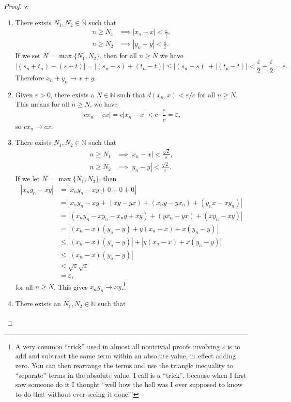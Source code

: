 \documentclass{article}
\newcommand{\N}{\mathbb{N}}
\theoremstyle{definition}
\begin{document}
	\begin{proof}{\color{white}w}
		\begin{enumerate}
			\item There exists $ N_1,N_2\in\N $ such that  
			\begin{align*}
				n\ge N_1&\implies |x_n-x|<\frac{\varepsilon}{2},\\
				n\ge N_2&\implies |y_n-y|<\frac{\varepsilon}{2}.
			\end{align*} 
			If we set $ N=\max\{N_1,N_2\} $, then for all $ n\ge N $ we have $$ |(s_n+t_n)-(s+t)|=|(s_n-s)+(t_n-t)|\le|(s_n-s)|+|(t_n-t)|<\frac{\varepsilon}{2}+\frac{\varepsilon}{2}=\varepsilon.$$ Therefore $ x_n+y_n\to x+y $.
			\item Given $ \varepsilon>0 $, there exists a $ N\in\N $ such that $ d(x_n,x)<\varepsilon/c$ for all $ n\ge N $. This means for all $ n\ge N $, we have $$ |cx_n-cx|=c|x_n-x|<c\cdot\frac{\varepsilon}{c}=\varepsilon ,$$ so $ cx_n\to cx $. 
			\item There exists $ N_1,N_2\in\N $ such that  
			\begin{align*}
				n\ge N_1&\implies |x_n-x|<\frac{\sqrt{2}}{\varepsilon},\\
				n\ge N_2&\implies |y_n-y|<\frac{\sqrt{2}}{\varepsilon}.
			\end{align*} 
			If we let $ N=\max\{N_1,N_2\} $, then \begin{align*}
				|x_ny_n-xy|&=|x_ny_n-xy+0+0+0|\\&=|x_ny_n-xy+(xy-yx)+(x_ny-yx_n)+(y_nx-xy_n)|\\&=|(x_ny_n-xy_n-x_ny+xy)+(yx_n-yx)+(xy_n-xy)|\\&=|(x_n-x)(y_n-y)+y(x_n-x)+x(y_n-y)|\\&\le|(x_n-x)(y_n-y)|+|y(x_n-x)+x(y_n-y)|\\&\le|(x_n-x)(y_n-y)|\\&<\sqrt{\varepsilon}\sqrt{\varepsilon}\\&=\varepsilon,
			\end{align*}
			for all $ n\ge N $. This gives $ x_ny_n\to xy $.\footnote{A very common ``trick'' used in almost all nontrivial proofs involving $ \varepsilon $ is to add and subtract the same term within an absolute value, in effect adding zero. You can then rearrange the terms and use the triangle inequality to ``separate'' terms in the absolute value. I call is a ``trick'', because when I first saw someone do it I thought ``well how the hell was I ever supposed to know to do that without ever seeing it done!''}
			\item There exists an $ N_1,N_2\in\N $ such that \begin{align*}

\end{align*}
\end{enumerate}
\end{proof}
\end{document}
